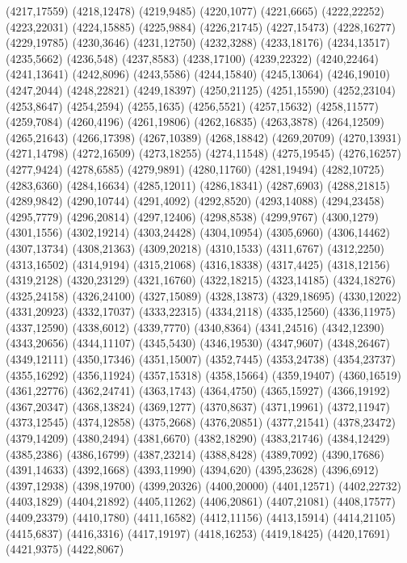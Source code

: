 (4217,17559)
(4218,12478)
(4219,9485)
(4220,1077)
(4221,6665)
(4222,22252)
(4223,22031)
(4224,15885)
(4225,9884)
(4226,21745)
(4227,15473)
(4228,16277)
(4229,19785)
(4230,3646)
(4231,12750)
(4232,3288)
(4233,18176)
(4234,13517)
(4235,5662)
(4236,548)
(4237,8583)
(4238,17100)
(4239,22322)
(4240,22464)
(4241,13641)
(4242,8096)
(4243,5586)
(4244,15840)
(4245,13064)
(4246,19010)
(4247,2044)
(4248,22821)
(4249,18397)
(4250,21125)
(4251,15590)
(4252,23104)
(4253,8647)
(4254,2594)
(4255,1635)
(4256,5521)
(4257,15632)
(4258,11577)
(4259,7084)
(4260,4196)
(4261,19806)
(4262,16835)
(4263,3878)
(4264,12509)
(4265,21643)
(4266,17398)
(4267,10389)
(4268,18842)
(4269,20709)
(4270,13931)
(4271,14798)
(4272,16509)
(4273,18255)
(4274,11548)
(4275,19545)
(4276,16257)
(4277,9424)
(4278,6585)
(4279,9891)
(4280,11760)
(4281,19494)
(4282,10725)
(4283,6360)
(4284,16634)
(4285,12011)
(4286,18341)
(4287,6903)
(4288,21815)
(4289,9842)
(4290,10744)
(4291,4092)
(4292,8520)
(4293,14088)
(4294,23458)
(4295,7779)
(4296,20814)
(4297,12406)
(4298,8538)
(4299,9767)
(4300,1279)
(4301,1556)
(4302,19214)
(4303,24428)
(4304,10954)
(4305,6960)
(4306,14462)
(4307,13734)
(4308,21363)
(4309,20218)
(4310,1533)
(4311,6767)
(4312,2250)
(4313,16502)
(4314,9194)
(4315,21068)
(4316,18338)
(4317,4425)
(4318,12156)
(4319,2128)
(4320,23129)
(4321,16760)
(4322,18215)
(4323,14185)
(4324,18276)
(4325,24158)
(4326,24100)
(4327,15089)
(4328,13873)
(4329,18695)
(4330,12022)
(4331,20923)
(4332,17037)
(4333,22315)
(4334,2118)
(4335,12560)
(4336,11975)
(4337,12590)
(4338,6012)
(4339,7770)
(4340,8364)
(4341,24516)
(4342,12390)
(4343,20656)
(4344,11107)
(4345,5430)
(4346,19530)
(4347,9607)
(4348,26467)
(4349,12111)
(4350,17346)
(4351,15007)
(4352,7445)
(4353,24738)
(4354,23737)
(4355,16292)
(4356,11924)
(4357,15318)
(4358,15664)
(4359,19407)
(4360,16519)
(4361,22776)
(4362,24741)
(4363,1743)
(4364,4750)
(4365,15927)
(4366,19192)
(4367,20347)
(4368,13824)
(4369,1277)
(4370,8637)
(4371,19961)
(4372,11947)
(4373,12545)
(4374,12858)
(4375,2668)
(4376,20851)
(4377,21541)
(4378,23472)
(4379,14209)
(4380,2494)
(4381,6670)
(4382,18290)
(4383,21746)
(4384,12429)
(4385,2386)
(4386,16799)
(4387,23214)
(4388,8428)
(4389,7092)
(4390,17686)
(4391,14633)
(4392,1668)
(4393,11990)
(4394,620)
(4395,23628)
(4396,6912)
(4397,12938)
(4398,19700)
(4399,20326)
(4400,20000)
(4401,12571)
(4402,22732)
(4403,1829)
(4404,21892)
(4405,11262)
(4406,20861)
(4407,21081)
(4408,17577)
(4409,23379)
(4410,1780)
(4411,16582)
(4412,11156)
(4413,15914)
(4414,21105)
(4415,6837)
(4416,3316)
(4417,19197)
(4418,16253)
(4419,18425)
(4420,17691)
(4421,9375)
(4422,8067)
